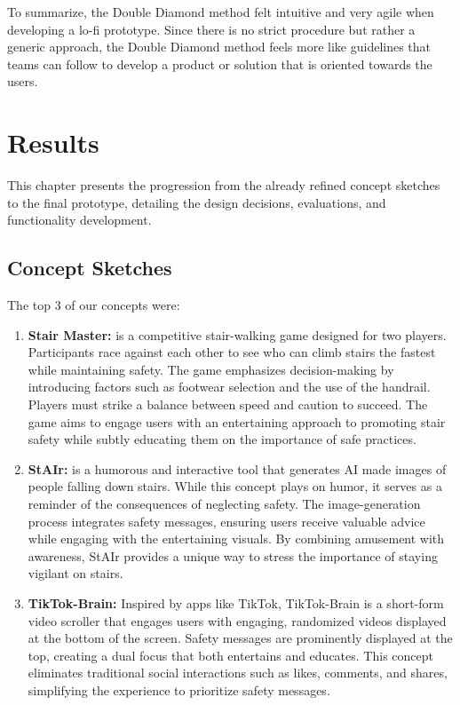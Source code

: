 \documentclass{article}
\begin{document}
To summarize, the Double Diamond method felt intuitive and very agile when developing a lo-fi prototype.
Since there is no strict procedure but rather a generic approach,
the Double Diamond method feels more like guidelines that teams can follow to develop a product or solution
that is oriented towards the users.

\section{Results}
This chapter presents the progression from the already refined concept sketches to the final prototype,
detailing the design decisions, evaluations, and functionality development.

\subsection{Concept Sketches}
The top 3 of our concepts were:

\begin{enumerate}
    \item \textbf{Stair Master:}
        is a competitive stair-walking game designed for two players.
        Participants race against each other to see who can climb stairs the fastest while maintaining safety.
        The game emphasizes decision-making by introducing factors such as footwear selection and the use of the handrail.
        Players must strike a balance between speed and caution to succeed.
        The game aims to engage users with an entertaining approach to promoting stair safety
        while subtly educating them on the importance of safe practices.
    \item \textbf{StAIr:}
        is a humorous and interactive tool that generates AI made images of people falling down stairs.
        While this concept plays on humor, it serves as a reminder of the consequences of neglecting safety.
        The image-generation process integrates safety messages,
        ensuring users receive valuable advice while engaging with the entertaining visuals.
        By combining amusement with awareness, StAIr provides a unique way to stress the importance of staying vigilant on stairs.
    \item \textbf{TikTok-Brain:}
        Inspired by apps like TikTok,
        TikTok-Brain is a short-form video scroller that engages users with engaging,
        randomized videos displayed at the bottom of the screen.
        Safety messages are prominently displayed at the top, creating a dual focus that both entertains and educates.
        This concept eliminates traditional social interactions such as likes, comments, and shares,
        simplifying the experience to prioritize safety messages.
\end{enumerate}
\end{document}
